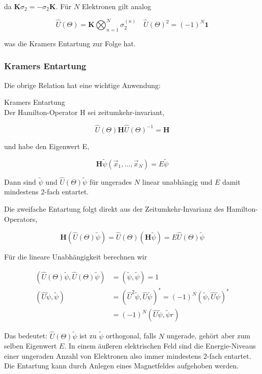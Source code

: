 \documentclass[10pt, letterpaper]{article}
\begin{document}
da $\mathbf{K} \sigma_{2}=-\sigma_{2} \mathbf{K}$. Für $N$ Elektronen gilt analog

$$
\widehat{U}(\Theta)=\mathbf{K} \bigotimes_{n=1}^{N} \sigma_{2}^{(n)} \quad \widehat{U}(\Theta)^{2}=(-1)^{N} \mathbf{1}
$$

was die Kramers Entartung zur Folge hat.

\subsubsection*{Kramers Entartung}
Die obrige Relation hat eine wichtige Anwendung:

Kramers Entartung\\
Der Hamilton-Operator H sei zeitumkehr-invariant,

$$
\widehat{U}(\Theta) \mathbf{H} \widehat{U}(\Theta)^{-1}=\mathbf{H}
$$

und habe den Eigenwert E,

$$
\mathbf{H} \widetilde{\psi}\left(\vec{x}_{1}, \ldots, \vec{x}_{N}\right)=E \widetilde{\psi}
$$

Dann sind $\widetilde{\psi}$ und $\widehat{U}(\Theta) \widetilde{\psi}$ für ungerades $N$ linear unabhängig und $E$ damit mindestens 2-fach entartet.

Die zweifache Entartung folgt direkt aus der Zeitumkehr-Invarianz des Hamilton-Operators,

$$
\mathbf{H}(\widehat{U}(\Theta) \widetilde{\psi})=\widehat{U}(\Theta)(\mathbf{H} \widetilde{\psi})=E \widehat{U}(\Theta) \widetilde{\psi}
$$

Für die lineare Unabhängigkeit berechnen wir

$$
\begin{aligned}
(\widehat{U}(\Theta) \widetilde{\psi}, \widehat{U}(\Theta) \widetilde{\psi}) & =(\widetilde{\psi}, \widetilde{\psi})=1 \\
(\widehat{U} \widetilde{\psi}, \widetilde{\psi}) & =\left(\widehat{U}^{2} \widetilde{\psi}, \widehat{U} \widetilde{\psi}\right)^{*}=(-1)^{N}(\widetilde{\psi}, \widehat{U} \widetilde{\psi})^{*} \\
& =(-1)^{N}(\widehat{U} \widetilde{\psi}, \widetilde{\psi} r)
\end{aligned}
$$

Das bedeutet: $\widehat{U}(\Theta) \widetilde{\psi}$ ist zu $\widetilde{\psi}$ orthogonal, falls $N$ ungerade, gehört aber zum selben Eigenwert $E$. In einem äußeren elektrischen Feld sind die Energie-Niveaus einer ungeraden Anzahl von Elektronen also immer mindestens 2-fach entartet. Die Entartung kann durch Anlegen eines Magnetfeldes aufgehoben werden.
\end{document}
